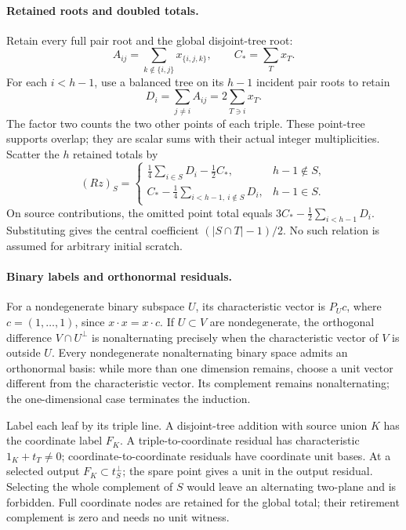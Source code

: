 \paragraph{Retained roots and doubled totals.}
Retain every full pair root and the global disjoint-tree root:
\[
 A_{ij}=\sum_{k\notin\{i,j\}}x_{\{i,j,k\}},\qquad C_* = \sum_T x_T.
\]
For each $i<h-1$, use a balanced tree on its $h-1$ incident pair roots to
retain
\[
 D_i=\sum_{j\ne i}A_{ij}=2\sum_{T\ni i}x_T.
\]
The factor two counts the two other points of each triple. These point-tree
supports overlap; they are scalar sums with their actual integer
multiplicities. Scatter the $h$ retained totals by
\[
 (Rz)_S=\begin{cases}
 \tfrac14\sum_{i\in S}D_i-\tfrac12C_*,&h-1\notin S,\\
 C_*-\tfrac14\sum_{i<h-1,\ i\notin S}D_i,&h-1\in S.
 \end{cases}
\]
On source contributions, the omitted point total equals
$3C_*-\tfrac12\sum_{i<h-1}D_i$.
Substituting gives the central coefficient $(|S\cap T|-1)/2$.
No such relation is assumed for arbitrary initial scratch.

\paragraph{Binary labels and orthonormal residuals.}
For a nondegenerate binary subspace $U$, its characteristic vector is $P_Uc$,
where $c=(1,\ldots,1)$, since $x\cdot x=x\cdot c$.
If $U\subset V$ are nondegenerate, the orthogonal difference
$V\cap U^\perp$ is nonalternating precisely when the characteristic vector of
$V$ is outside $U$. Every nondegenerate nonalternating binary space admits
an orthonormal basis: while more than one dimension remains, choose a unit
vector different from the characteristic vector. Its complement remains
nonalternating; the one-dimensional case terminates the induction.

Label each leaf by its triple line. A disjoint-tree addition with source
union $K$ has the coordinate label $F_K$. A triple-to-coordinate residual
has characteristic $1_K+t_T\ne0$; coordinate-to-coordinate residuals have
coordinate unit bases. At a selected output $F_K\subset t_S^\perp$; the
spare point gives a unit in the output residual. Selecting the whole
complement of $S$ would leave an alternating two-plane and is forbidden.
Full coordinate nodes are retained for the global total; their retirement
complement is zero and needs no unit witness.

